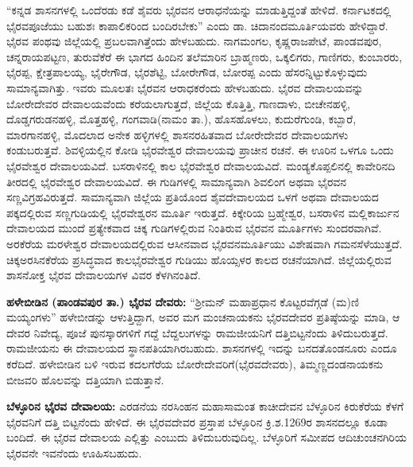 “ಕನ್ನಡ ಶಾಸನಗಳಲ್ಲಿ ಒಂದೆರಡು ಕಡೆ ಶೈವರು ಭೈರವನ ಆರಾಧನೆಯನ್ನು ಮಾಡುತ್ತಿದ್ದಂತೆ ಹೇಳಿದೆ. ಕರ್ನಾಟಕದಲ್ಲಿ ಭೈರವಪೂಜೆಯು ಬಹುಶಃ ಕಾಪಾಲಿಕರಿಂದ ಬಂದಿರಬೇಕು” ಎಂದು ಡಾ. ಚಿದಾನಂದಮೂರ್ತಿಯವರು ಹೇಳಿದ್ದಾರೆ. ಭೈರವ ಪಂಥವು ಜಿಲ್ಲೆಯಲ್ಲಿ ಪ್ರಬಲವಾಗಿತ್ತೆಂದು ಹೇಳಬಹುದು. ನಾಗಮಂಗಲ, ಕೃಷ್ಣರಾಜಪೇಟೆ, ಪಾಂಡವಪುರ, ಚನ್ನರಾಯಪಟ್ಟಣ, ತುರುವೆಕೆರೆ ಈ ಭಾಗದ ಹಿಂದಿನ ತಲೆಮಾರಿನ ಬ್ರಾಹ್ಮಣರು, ಒಕ್ಕಲಿಗರು, ಗಾಣಿಗರು, ಕುಂಬಾರರು, ಭೈರಪ್ಪ, ಕ್ಷೇತ್ರಪಾಲಯ್ಯ, ಭೈರೇಗೌಡ, ಭೈರಶೆಟ್ಟಿ, ಬೋರೇಗೌಡ, ಬೋರಪ್ಪ ಎಂದು ಹೆಸರನ್ನಿಟ್ಟುಕೊಳ್ಳುವುದು ಸಾಮಾನ್ಯ\-ವಾಗಿತ್ತು. ಇವರು ಮೂಲತಃ ಭೈರವನ ಆರಾಧಕರೆಂದು ಹೇಳಬಹುದು. ಭೈರವ ದೇವಾಲಯವನ್ನು ಬೋರೇದೇವರ ದೇವಾಲಯವೆಂದು ಕರೆಯಲಾಗುತ್ತದೆ, ಜಿಲ್ಲೆಯ ಕೊತ್ತಿತ್ತಿ, ಗಾಣದಾಳು, ಬೀಚೇನಹಳ್ಳಿ, ದೊಡ್ಡಗರುಡನಹಳ್ಳಿ, ಮೊತ್ತಹಳ್ಳಿ, ಗಂಗವಾಡಿ(ನಾಮಂ ತಾ.), ಹೊಸಹೊಳಲು, ಕುದುರೆಗುಂಡಿ, ಕಬ್ಬಾರೆ, ಮಾರಗಾನಹಳ್ಳಿ, ಮೊದಲಾದ ಅನೇಕ ಹಳ್ಳಿಗಳಲ್ಲಿ ಶಾಸನರಹಿತವಾದ ಬೋರೇದೇವರ ದೇವಾಲಯಗಳು ಕಂಡುಬರುತ್ತವೆ. ಶಿವಳ್ಳಿಯಲ್ಲಿನ ಕೋಡಿ ಭೈರವೇಶ್ವರ ದೇವಾಲಯವು ಪ್ರಾಚೀನ ರಚನೆ. ಈ ಊರಿನ ಒಳಗೂ ಒಂದು ಭೈರವೇಶ್ವರ ದೇವಾಲಯವಿದೆ. ಬಸರಾಳಿನಲ್ಲಿ ಕಾಲ ಭೈರವೇಶ್ವರ ದೇವಾಲಯವಿದೆ. ಮಂಡ್ಯಕೊಪ್ಪಲಿನಲ್ಲಿ ಕಾವೇರಿನದಿ ತೀರದಲ್ಲಿ ಭೈರವೇಶ್ವರ ದೇವಾಲಯವಿದೆ. ಈ ಗುಡಿಗಳಲ್ಲಿ ಸಾಮಾನ್ಯವಾಗಿ ಶಿವಲಿಂಗ ಅಥವಾ ಭೈರವನ ಸಣ್ಣವಿಗ್ರಹವಿರುತ್ತದೆ. ಸಾಮಾನ್ಯವಾಗಿ ಜಿಲ್ಲೆಯ ಪ್ರತಿಯೊಂದ ಶೈವದೇವಾಲಯದ ಒಳಗೆ ಅಥವಾ ದೇವಾಲಯದ ಪಕ್ಕದಲ್ಲಿರುವ ಸಣ್ಣಗುಡಿಯಲ್ಲಿ ಭೈರವೇಶ್ವರನ ಮೂರ್ತಿ ಇರುತ್ತದೆ. ಕಿಕ್ಕೇರಿಯ ಬ್ರಹ್ಮೇಶ್ವರ, ಬಸರಾಳಿನ ಮಲ್ಲಿಕಾರ್ಜುನ ದೇವಾಲಯದ ಮುಂದೆ ಪ್ರತ್ಯೇಕವಾದ ಚಿಕ್ಕ ಗುಡಿಗಳಲ್ಲಿರುವ ನಿಂತಿರುವ ಭೈರವನ ಮೂರ್ತಿಗಳು ಸುಂದರವಾಗಿವೆ. ಅರಕೆರೆಯ ಮರಳೇಶ್ವರ ದೇವಾಲಯದಲ್ಲಿರುವ ಆಸೀನವಾದ ಭೈರವನಮೂರ್ತಿಯು ವಿಶೇಷವಾಗಿ ಗಮನಸೆಳೆಯುತ್ತದೆ. ಚಿಕ್ಕಅರಸಿನಕೆರೆಯ ಪ್ರಸಿದ್ಧವಾದ ಕಾಲಭೈರವೇಶ್ವರ ಗುಡಿಯು ಹೊಯ್ಸಳರ ಕಾಲದ ರಚನೆಯಾಗಿದೆ. ಜಿಲ್ಲೆಯಲ್ಲಿರುವ ಶಾಸನೋಕ್ತ ಭೈರವ ದೇವಾಲಯಗಳ ವಿವರ ಕೆಳಗಿನಂತಿದೆ.

\textbf{ಹಳೇಬೀಡಿನ (ಪಾಂಡವಪುರ ತಾ.) ಭೈರವ ದೇವರು:} “ಶ‍್ರೀಮನ್​ ಮಹಾಪ್ರಧಾನ ಕೊಟ್ಟರವೆಗ್ಗಡೆ (ಮ)ಣಿ ಮಯ್ಯಂಗಳು” ಹಳೇಬೀಡನ್ನು ಆಳುತ್ತಿದ್ದಾಗ, ಅವರ ಮಗ ಮಂಚನಾಯಕನು ಭೈರವದೇವರ ಪ್ರತಿಷ್ಠೆಯನ್ನು ಮಾಡಿ, ಆ ದೇವರ ನಿವೇದ್ಯ, ಪೂಜೆ ಪುನಸ್ಕಾರಗಳಿಗೆ ಗದ್ದೆ ಬೆದ್ದಲುಗಳನ್ನು ರಾಮಜೀಯನಿಗೆ ದತ್ತಿಬಿಟ್ಟನೆಂದು ತಿಳಿದುಬರುತ್ತದೆ. ರಾಮಜೀಯನು ಈ ದೇವಾಲಯದ ಸ್ಥಾನಪತಿಯಾಗಿರಬಹುದು. ಶಾಸನಗಳಲ್ಲಿ ಇದನ್ನು ಬನದತೊಂಡನೂರು ಎಂದೂ ಕರೆದಿದೆ. ಹಳೇಬೀಡಿನ ಬಳಿ ಇರುವ ಕದಲಗೆರೆಯ ಬೋರೇದೇವರಿಗೆ(ಭೈರವದೇವರು), ತಿಮ್ಮಣ್ಣದಂಡನಾಯಕನು ಬೀಜವರಿ ಹೊಲವನ್ನು ದತ್ತಿಯಾಗಿ ಬಿಡುತ್ತಾನೆ.

\textbf{ಬೆಳ್ಳೂರಿನ ಭೈರವ ದೇವಾಲಯ:} ಎರಡನೆಯ ನರಸಿಂಹನ ಮಹಾಸಾಮಂತ ಕಾಚೀದೇವನ ಬೆಳ್ಳೂರಿನ ಕಿರುಕೆರೆಯ ಕೆಳಗೆ ಭೈರವನಿಗೆ ದತ್ತಿ ಬಿಟ್ಟನೆಂದು ಹೇಳಿದೆ. ಈ ಭೈರವದೇವರ ಪ್ರಸ್ತಾಪ ಬೆಳ್ಳೂರಿನ ಕ್ರಿ.ಶ.1269ರ ಶಾಸನದಲ್ಲೂ ಕೂಡಾ ಬಂದಿದೆ. ಈ ಭೈರವ ದೇವಾಲಯ ಎಲ್ಲಿತ್ತು ಎಂಬುದು ತಿಳಿದುಬರುವುದಿಲ್ಲ. ಬೆಳ್ಳೂರಿಗೆ ಸಮೀಪದ ಆದಿಚುಂಚನಗಿರಿಯ ಭೈರವನೇ ಇವನೆಂದು ಊಹಿಸಬಹುದು.


